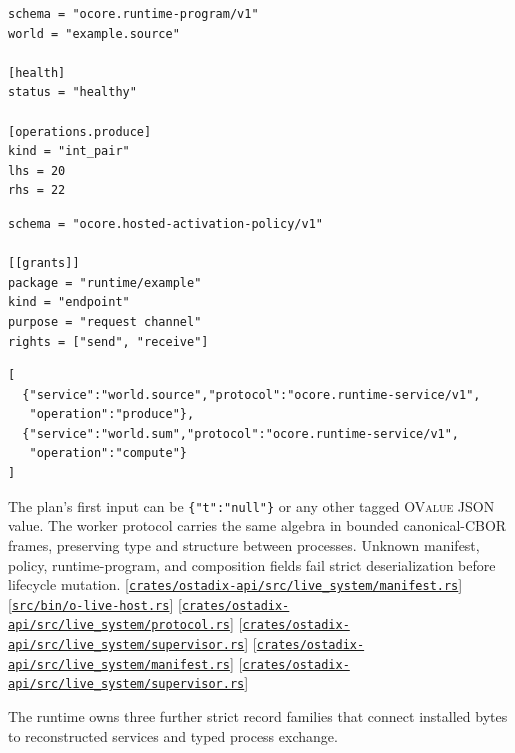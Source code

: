\documentclass[11pt,oneside]{article}
\newcommand{\ovalue}{{\mdseries\textsc{OValue}}}
\newcommand{\src}[1]{\textcolor{OSlate}{\scriptsize[\href{https://github.com/lostadi/OSTADIX/blob/c0b02c326b2329a95ba52447c7180bc93957cd57/#1}{\nolinkurl{#1}}]}\allowbreak}
\begin{document}
\begin{minipage}[t]{0.48\textwidth}
\begin{lstlisting}[style=plaincode]
schema = "ocore.runtime-program/v1"
world = "example.source"

[health]
status = "healthy"

[operations.produce]
kind = "int_pair"
lhs = 20
rhs = 22
\end{lstlisting}
\end{minipage}\hfill
\begin{minipage}[t]{0.48\textwidth}
\begin{lstlisting}[style=plaincode]
schema = "ocore.hosted-activation-policy/v1"

[[grants]]
package = "runtime/example"
kind = "endpoint"
purpose = "request channel"
rights = ["send", "receive"]
\end{lstlisting}
\end{minipage}

\begin{lstlisting}[style=plaincode]
[
  {"service":"world.source","protocol":"ocore.runtime-service/v1",
   "operation":"produce"},
  {"service":"world.sum","protocol":"ocore.runtime-service/v1",
   "operation":"compute"}
]
\end{lstlisting}

The plan's first input can be \texttt{\{"t":"null"\}} or any other tagged
\ovalue{} JSON value. The worker protocol carries the same algebra in bounded
canonical-CBOR frames, preserving type and structure between processes.
Unknown manifest, policy, runtime-program, and composition fields fail strict
deserialization before lifecycle mutation.
\src{crates/ostadix-api/src/live_system/manifest.rs}
\src{src/bin/o-live-host.rs}
\src{crates/ostadix-api/src/live_system/protocol.rs}
\src{crates/ostadix-api/src/live_system/supervisor.rs}
\src{crates/ostadix-api/src/live_system/manifest.rs}
\src{crates/ostadix-api/src/live_system/supervisor.rs}

The runtime owns three further strict record families that connect installed
bytes to reconstructed services and typed process exchange.
\end{document}

